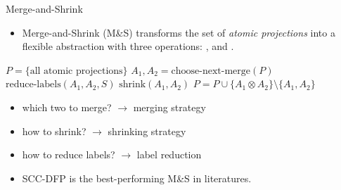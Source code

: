 
\begin{myblock}{Merge-and-Shrink}
\Large
\begin{itemize}
\item Merge-and-Shrink (M\&S) transforms the set of \emph{atomic projections} into a flexible abstraction with three operations: ,  and .
\end{itemize}

\begin{minipage}{0.3\textwidth}
  \centering
\end{minipage}
\hspace*{1in}
\begin{minipage}{0.5\textwidth}
\begin{algorithm}[H]
\begin{algorithmic}[1]
\STATE $P=\{\text{all atomic projections}\}$
	\STATE $A_1,A_2=\text{choose-next-merge}(P)$
		\STATE $\text{reduce-labels}(A_1,A_2,S)$
		\STATE $\text{shrink}(A_1,A_2)$
	\ENDIF
\STATE $P=P\cup\{A_1 \otimes A_2\}\setminus\{A_1,A_2\}$
\ENDWHILE
\end{algorithmic}
\caption{Merge-and-Shrink}
\label{alg:seq}
\end{algorithm}

\normalsize
\begin{itemize}
\item which two to merge? $\rightarrow$ merging strategy 
\item how to shrink? $\rightarrow$ shrinking strategy
\item how to reduce labels? $\rightarrow$ label reduction
\end{itemize}
\end{minipage}
\vspace{0.3in}
\begin{itemize}
\item SCC-DFP is the best-performing M\&S in literatures.
\end{itemize}

\end{myblock}

